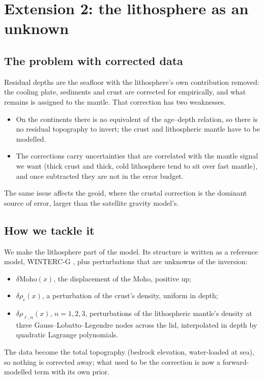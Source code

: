 \chapter{Extension 2: the lithosphere as an unknown}
\label{ch:lithosphere}

\section{The problem with corrected data}

Residual depths are the seafloor with the lithosphere's own contribution removed: the cooling plate, sediments and crust are corrected for empirically, and what remains is assigned to the mantle.
That correction has two weaknesses.
\begin{itemize}[nosep]
\item On the continents there is no equivalent of the age--depth relation, so there is no residual topography to invert; the crust and lithospheric mantle have to be modelled.
\item The corrections carry uncertainties that are correlated with the mantle signal we want (thick crust and thick, cold lithosphere tend to sit over fast mantle), and once subtracted they are not in the error budget.
\end{itemize}
The same issue affects the geoid, where the crustal correction is the dominant source of error, larger than the satellite gravity model's.

\section{How we tackle it}

We make the lithosphere part of the model.
Its structure is written as a reference model, WINTERC-G \citep{fullea_winterc_2021}, plus perturbations that are unknowns of the inversion:
\begin{itemize}[nosep]
\item $\delta\mathrm{Moho}(x)$, the displacement of the Moho, positive up;
\item $\delta\rho_c(x)$, a perturbation of the crust's density, uniform in depth;
\item $\delta\rho_{\ell,n}(x)$, $n=1,2,3$, perturbations of the lithospheric mantle's density at three Gauss--Lobatto--Legendre nodes across the lid, interpolated in depth by quadratic Lagrange polynomials.
\end{itemize}
The data become the total topography (bedrock elevation, water-loaded at sea), so nothing is corrected away; what used to be the correction is now a forward-modelled term with its own prior.

